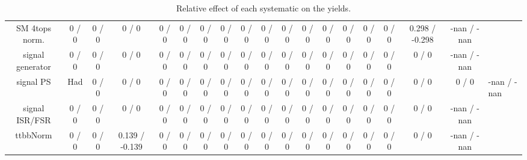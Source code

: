 \documentclass[10pt]{article}
\begin{document}
\begin{table}[htbp]
\begin{center}
\begin{tabular}{|c|c|c|c|c|c|c|c|c|c|c|c|c|c|c|c|c|c|}
  SM 4tops norm. & 0 / 0 & 0 / 0 & 0 / 0 & 0 / 0 & 0 / 0 & 0 / 0 & 0 / 0 & 0 / 0 & 0 / 0 & 0 / 0 & 0 / 0 & 0 / 0 & 0 / 0 & 0 / 0 & 0 / 0 & 0.298 / -0.298 & -nan / -nan \\ 
  signal generator & 0 / 0 & 0 / 0 & 0 / 0 & 0 / 0 & 0 / 0 & 0 / 0 & 0 / 0 & 0 / 0 & 0 / 0 & 0 / 0 & 0 / 0 & 0 / 0 & 0 / 0 & 0 / 0 & 0 / 0 & 0 / 0 & -nan / -nan \\ 
  signal PS & Had & 0 / 0 & 0 / 0 & 0 / 0 & 0 / 0 & 0 / 0 & 0 / 0 & 0 / 0 & 0 / 0 & 0 / 0 & 0 / 0 & 0 / 0 & 0 / 0 & 0 / 0 & 0 / 0 & 0 / 0 & 0 / 0 & -nan / -nan \\ 
  signal ISR/FSR & 0 / 0 & 0 / 0 & 0 / 0 & 0 / 0 & 0 / 0 & 0 / 0 & 0 / 0 & 0 / 0 & 0 / 0 & 0 / 0 & 0 / 0 & 0 / 0 & 0 / 0 & 0 / 0 & 0 / 0 & 0 / 0 & -nan / -nan \\ 
 ttbbNorm & 0 / 0 & 0 / 0 & 0.139 / -0.139 & 0 / 0 & 0 / 0 & 0 / 0 & 0 / 0 & 0 / 0 & 0 / 0 & 0 / 0 & 0 / 0 & 0 / 0 & 0 / 0 & 0 / 0 & 0 / 0 & 0 / 0 & -nan / -nan \\ 
\hline 
\end{tabular} 
\caption{Relative effect of each systematic on the yields.} 
\end{center} 
\end{table} 
\end{document}
